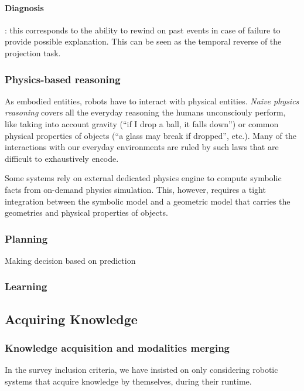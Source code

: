 \documentclass[a4paper, twocolumn]{article}
\begin{document}
\paragraph{Diagnosis}: this corresponds to the ability to rewind on past events
in case of failure to provide possible explanation. This can be seen as the
temporal reverse of the projection task.

\subsubsection{Physics-based reasoning}
\label{sect|physics}

As embodied entities, robots have to interact with physical entities.
\emph{Naive physics reasoning} covers all the everyday reasoning the humans
unconsciouly perform, like taking into account gravity (``if I drop a ball, it
falls down'') or common physical properties of objects (``a glass may break if
dropped'', etc.). Many of the interactions with our everyday environments are
ruled by such laws that are difficult to exhaustively encode.

Some systems \cite{Kunze2011a} rely on external dedicated physics engine to
compute symbolic facts from on-demand physics simulation. This, however,
requires a tight integration between the symbolic model and a geometric model
that carries the geometries and physical properties of objects.

\subsubsection{Planning}
\label{sect|planning}

Making decision based on prediction

\subsubsection{Learning}
\label{sect|learning}

\subsection{Acquiring Knowledge}

\subsubsection{Knowledge acquisition and modalities merging}
\label{sect|knowledge-acquisition}

In the survey inclusion criteria, we have insisted on only considering robotic
systems that acquire knowledge by themselves, during their runtime.
\end{document}
